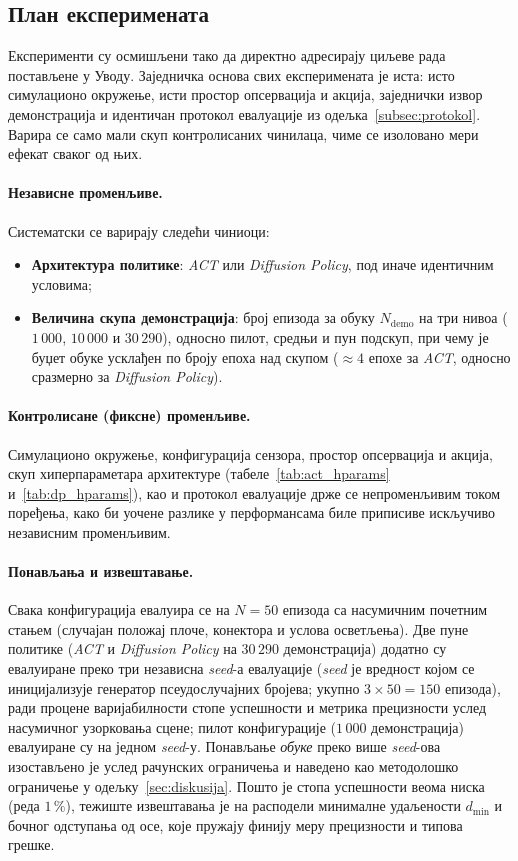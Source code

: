\documentclass[12pt, a4paper]{article}
\begin{document}
\subsection{План експеримената}
\label{subsec:plan_eksperimenata}

Експерименти су осмишљени тако да директно адресирају циљеве рада постављене у Уводу.
Заједничка основа свих експеримената је иста: исто симулационо окружење, исти простор опсервација и акција, заједнички извор демонстрација и идентичан протокол евалуације из одељка~\ref{subsec:protokol}.
Варира се само мали скуп контролисаних чинилаца, чиме се изоловано мери ефекат сваког од њих.

\paragraph{Независне променљиве.}
Систематски се варирају следећи чиниоци:
\begin{itemize}
    \item \textbf{Архитектура политике}: \textit{ACT} или \textit{Diffusion Policy}, под иначе идентичним условима;
    \item \textbf{Величина скупа демонстрација}: број епизода за обуку $N_{\mathrm{demo}}$ на три нивоа ($1\,000$, $10\,000$ и $30\,290$), односно пилот, средњи и пун подскуп, при чему је буџет обуке усклађен по броју епоха над скупом ($\approx 4$ епохе за \textit{ACT}, односно сразмерно за \textit{Diffusion Policy}).
\end{itemize}

\paragraph{Контролисане (фиксне) променљиве.}
Симулационо окружење, конфигурација сензора, простор опсервација и акција, скуп хиперпараметара архитектуре (табеле~\ref{tab:act_hparams} и~\ref{tab:dp_hparams}), као и протокол евалуације држе се непроменљивим током поређења, како би уочене разлике у перформансама биле приписиве искључиво независним променљивим.

\paragraph{Понављања и извештавање.}
Свака конфигурација евалуира се на $N = 50$ епизода са насумичним почетним стањем (случајан положај плоче, конектора и услова осветљења).
Две пуне политике (\textit{ACT} и \textit{Diffusion Policy} на $30\,290$ демонстрација) додатно су евалуиране преко три независна \textit{seed}-а евалуације (\textit{seed} је вредност којом се иницијализује генератор псеудослучајних бројева; укупно $3\times 50 = 150$ епизода), ради процене варијабилности стопе успешности и метрика прецизности услед насумичног узорковања сцене; пилот конфигурације ($1\,000$ демонстрација) евалуиране су на једном \textit{seed}-у.
Понављање \emph{обуке} преко више \textit{seed}-ова изостављено је услед рачунских ограничења и наведено као методолошко ограничење у одељку~\ref{sec:diskusija}.
Пошто је стопа успешности веома ниска (реда $1\,\%$), тежиште извештавања је на расподели минималне удаљености $d_{\min}$ и бочног одступања од осе, које пружају финију меру прецизности и типова грешке.
\end{document}
